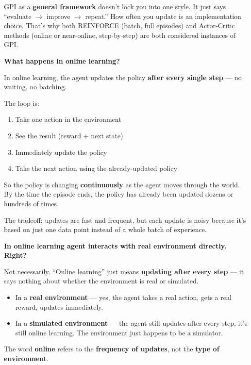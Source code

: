 GPI as a \textbf{general framework} doesn't lock you into one style. It just says ``evaluate $\to$ improve $\to$ repeat.'' How often you update is an implementation choice. That's why both REINFORCE (batch, full episodes) and Actor-Critic methods (online or near-online, step-by-step) are both considered instances of GPI.

\medskip

\textbf{What happens in online learning?}

In online learning, the agent updates the policy \textbf{after every single step} --- no waiting, no batching.

The loop is:

\begin{enumerate}
    \item Take one action in the environment
    \item See the result (reward + next state)
    \item Immediately update the policy
    \item Take the next action using the already-updated policy
\end{enumerate}

So the policy is changing \textbf{continuously} as the agent moves through the world. By the time the episode ends, the policy has already been updated dozens or hundreds of times.

The tradeoff: updates are fast and frequent, but each update is noisy because it's based on just one data point instead of a whole batch of experience.

\medskip

\textbf{In online learning agent interacts with real environment directly. Right?}

Not necessarily. ``Online learning'' just means \textbf{updating after every step} --- it says nothing about whether the environment is real or simulated.

\begin{itemize}
    \item In a \textbf{real environment} --- yes, the agent takes a real action, gets a real reward, updates immediately.
    \item In a \textbf{simulated environment} --- the agent still updates after every step, it's still online learning. The environment just happens to be a simulator.
\end{itemize}

The word \textbf{online} refers to the \textbf{frequency of updates}, not the \textbf{type of environment}.

